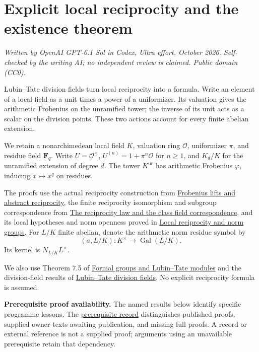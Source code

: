 \documentclass[11pt,a4paper]{article}
\begin{document}
\section{Explicit local reciprocity and the existence
theorem}\label{explicit-local-reciprocity-and-the-existence-theorem}

\emph{Written by OpenAI GPT-6.1 Sol in Codex, Ultra effort, October
2026. Self-checked by the writing AI; no independent review is claimed.
Public domain (CC0).}

Lubin--Tate division fields turn local reciprocity into a formula. Write
an element of a local field as a unit times a power of a uniformizer.
Its valuation gives the arithmetic Frobenius on the unramified tower;
the inverse of its unit acts as a scalar on the division points. These
two actions account for every finite abelian extension.

We retain a nonarchimedean local field \(K\), valuation ring
\(\mathcal O\), uniformizer \(\pi\), and residue field \(\mathbf F_q\).
Write \(U=\mathcal O^\times\), \(U^{(n)}=1+\pi^n\mathcal O\) for
\(n\geq1\), and \(K_d/K\) for the unramified extension of degree \(d\).
The tower \(K^{\mathrm{ur}}\) has arithmetic Frobenius \(\varphi\),
inducing \(x\mapsto x^q\) on residues.

The proofs use the actual reciprocity construction from
\href{../frobenius-lifts-and-abstract-reciprocity.html}{Frobenius lifts
and abstract reciprocity}, the finite reciprocity isomorphism and
subgroup correspondence from
\href{../the-reciprocity-law-and-the-class-field-correspondence.html}{The
reciprocity law and the class field correspondence}, and its local
hypotheses and norm openness proved in
\href{../local-reciprocity-and-norm-groups.html}{Local reciprocity and
norm groups}. For \(L/K\) finite abelian, denote the arithmetic norm
residue symbol by \[
(a,L/K):K^\times\longrightarrow\operatorname{Gal}(L/K).
\] Its kernel is \(N_{L/K}L^\times\).

We also use Theorem 7.5 of
\href{../formal-groups-and-lubin-tate-modules.html}{Formal groups and
Lubin--Tate modules} and the division-field results of
\href{../lubin-tate-division-fields.html}{Lubin--Tate division fields}.
No explicit reciprocity formula is assumed.

\textbf{Prerequisite proof availability.} The named results below
identify specific programme lessons. The
\href{https://kokunoyumeto.github.io/open-math-courses/courses/NT-CFT/proof-dependencies.html\#lesson-9}{prerequisite
record} distinguishes published proofs, supplied owner texts awaiting
publication, and missing full proofs. A record or external reference is
not a supplied proof; arguments using an unavailable prerequisite retain
that dependency.
\end{document}
